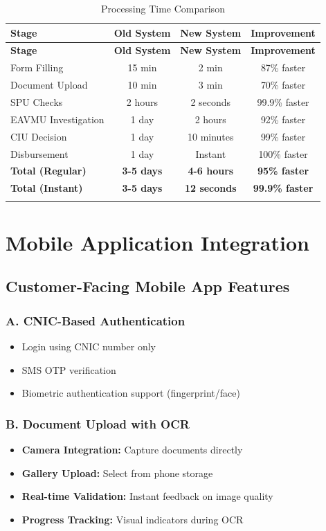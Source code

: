 \documentclass[12pt,a4paper]{article}
\begin{document}
\begin{longtable}{@{}lccc@{}}
\toprule
\textbf{Stage} & \textbf{Old System} & \textbf{New System} & \textbf{Improvement} \\ \midrule
\endfirsthead
\toprule
\textbf{Stage} & \textbf{Old System} & \textbf{New System} & \textbf{Improvement} \\ \midrule
\endhead
Form Filling & 15 min & 2 min & 87\% faster \\
Document Upload & 10 min & 3 min & 70\% faster \\
SPU Checks & 2 hours & 2 seconds & 99.9\% faster \\
EAVMU Investigation & 1 day & 2 hours & 92\% faster \\
CIU Decision & 1 day & 10 minutes & 99\% faster \\
Disbursement & 1 day & Instant & 100\% faster \\
\textbf{Total (Regular)} & \textbf{3-5 days} & \textbf{4-6 hours} & \textbf{95\% faster} \\
\textbf{Total (Instant)} & \textbf{3-5 days} & \textbf{12 seconds} & \textbf{99.9\% faster} \\
\bottomrule
\caption{Processing Time Comparison}
\end{longtable}

\newpage

\section{Mobile Application Integration}

\subsection{Customer-Facing Mobile App Features}

\subsubsection{A. CNIC-Based Authentication}
\begin{itemize}
    \item Login using CNIC number only
    \item SMS OTP verification
    \item Biometric authentication support (fingerprint/face)
\end{itemize}

\subsubsection{B. Document Upload with OCR}
\begin{itemize}
    \item \textbf{Camera Integration:} Capture documents directly
    \item \textbf{Gallery Upload:} Select from phone storage
    \item \textbf{Real-time Validation:} Instant feedback on image quality
    \item \textbf{Progress Tracking:} Visual indicators during OCR
\end{itemize}
\end{document}
